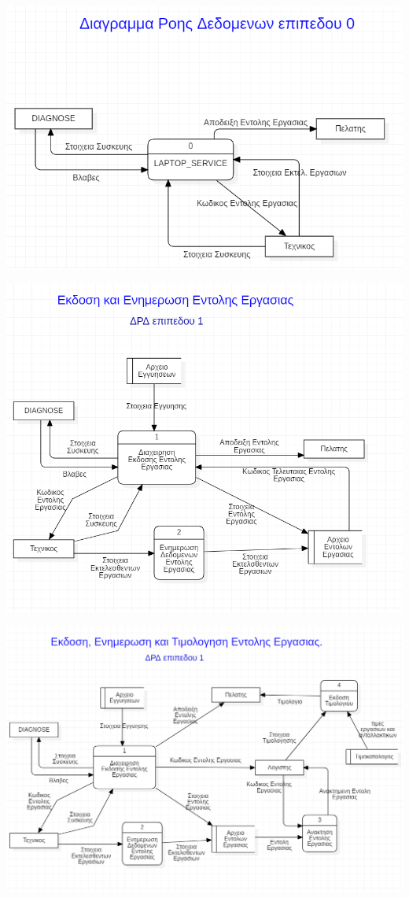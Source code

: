 \documentclass[12pt]{article}
\begin{document}
\begin{center}
\includegraphics[scale=0.9]{MerosB/B1}
\end{center}
\begin{center}
\includegraphics[scale=0.9]{MerosB/B2}
\end{center}
\begin{center}
\includegraphics[scale=0.7]{MerosB/B3}
\end{center}
\end{document}
